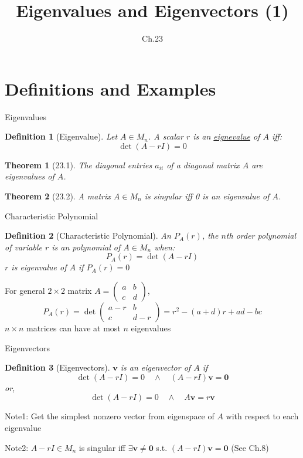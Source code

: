 \documentclass[a4paper,11pt]{article}
\author[조남운]{\mail}
\title{Eigenvalues and Eigenvectors (1)}
\subtitle{Ch.23}
\newtheorem{defn}{Definition}
\newtheorem{thm}{Theorem}
\newcommand{\bd}{\mathbf}
\begin{document}
	
\maketitle


\section{Definitions and Examples} %
\label{sec:definitions_and_examples}
\begin{frame}[t]{Eigenvalues}
	\begin{defn}
		[Eigenvalue] Let $A\in M_n$. A scalar $r$ is an \uline{eignevalue} of $A$ iff:
		\[
			\det(A-rI)=0
		\]
	\end{defn}
	\begin{thm}
		[23.1] The diagonal entries $a_{ii}$ of a diagonal matrix $A$ are eigenvalues of $A$.
	\end{thm}
	\begin{thm}
		[23.2] A matrix $A\in M_n$ is singular iff 0 is an eigenvalue of $A$. 
	\end{thm}
\end{frame}

\begin{frame}[t]{Characteristic Polynomial}
	\begin{defn}
		[Characteristic Polynomial] An $P_A(r)$, the $n$th order polynomial of variable $r$ is an polynomial of $A\in M_n$ when:\[
			P_A(r)=\det(A-rI) 
		\]
		$r$ is eigenvalue of $A$ if $P_A(r)=0$
	\end{defn}
	For general $2\times 2$ matrix $A = \begin{pmatrix}
		a & b\\c&d
	\end{pmatrix}$, 
	\[
		P_A(r) = \det \begin{pmatrix}
			a-r & b \\
			c & d-r
		\end{pmatrix} = r^2 - (a+d)r+ad-bc
	\]
	$n\times n$ matrices can have at most $n$ eigenvalues
\end{frame}
\begin{frame}[t]{Eigenvectors}
	\begin{defn}
		[Eigenvectors] $\bd{v}$ is an eigenvector of $A$ if \[
			\det(A-rI)=0 \quad \land \quad (A-rI)\bd{v}=\bd{0}
		\]or, \[
			\det(A-rI)=0 \quad \land \quad A\bd{v} = r\bd{v}
		\]
	\end{defn}
	Note1: Get the simplest nonzero vector from eigenspace of $A$ with respect to each eigenvalue
	 
	Note2: $A-rI\in M_n$ is singular iff $\exists \bd{v}\neq \bd{0}$  s.t. $(A-rI)\bd{v}=\bd{0}$ (See Ch.8)
\end{frame}
\end{document}

